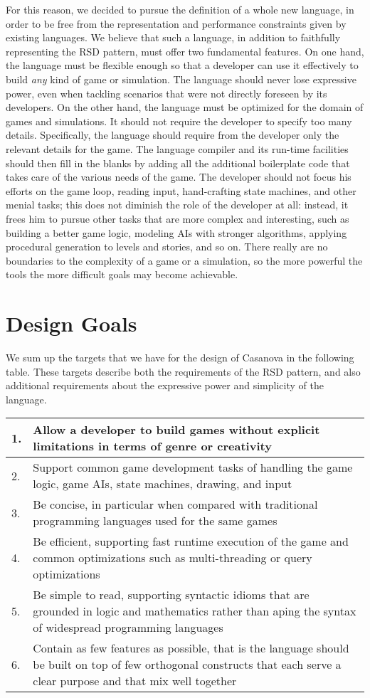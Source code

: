For this reason, we decided to pursue the definition of a whole new language, in order to be free from the representation and performance constraints given by existing languages. We believe that such a language, in addition to faithfully representing the RSD pattern, must offer two fundamental features. On one hand, the language must be flexible enough so that a developer can use it effectively to build \textit{any} kind of game or simulation. The language should never lose expressive power, even when tackling scenarios that were not directly foreseen by its developers. On the other hand, the language must be optimized for the domain of games and simulations. It should not require the developer to specify too many details. Specifically, the language should require from the developer only the relevant details for the game. The language compiler and its run-time facilities should then fill in the blanks by adding all the additional boilerplate code that takes care of the various needs of the game. The developer should not focus his efforts on the game loop, reading input, hand-crafting state machines, and other menial tasks; this does not diminish the role of the developer at all: instead, it frees him to pursue other tasks that are more complex and interesting, such as building a better game logic, modeling AIs with stronger algorithms, applying procedural generation to levels and stories, and so on. There really are no boundaries to the complexity of a game or a simulation, so the more powerful the tools the more difficult goals may become achievable.


\section{Design Goals}
We sum up the targets that we have for the design of Casanova in the following table. These targets describe both the requirements of the RSD pattern, and also additional requirements about the expressive power and simplicity of the language.

\begin{tabular}{ | l | p{9cm} | }
\hline
1. & Allow a developer to build games without explicit limitations in terms of genre or creativity \\
\hline
2. & Support common game development tasks of handling the game logic, game AIs, state machines, drawing, and input \\
\hline
3. & Be concise, in particular when compared with traditional programming languages used for the same games \\
\hline
4. & Be efficient, supporting fast runtime execution of the game and common optimizations such as multi-threading or query optimizations \\
\hline
5. & Be simple to read, supporting syntactic idioms that are grounded in logic and mathematics rather than aping the syntax of widespread programming languages \\
\hline
6. & Contain as few features as possible, that is the language should be built on top of few orthogonal \cite{CHAPTER_4_ORTHOGONALITY_PL} constructs that each serve a clear purpose and that mix well together \\
\hline
\end{tabular} 

